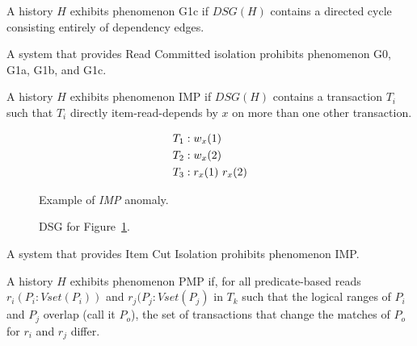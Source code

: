 \begin{definition}
A history $H$ exhibits phenomenon G1c if $DSG(H)$ contains a directed
cycle consisting entirely of dependency edges.
\end{definition}

\begin{definition}
A system that provides Read Committed isolation prohibits phenomenon G0, G1a, G1b, and G1c.
\end{definition}

\begin{definition}
\label{def:imp}
A history $H$ exhibits phenomenon IMP if $DSG(H)$ contains a
transaction $T_i$ such that $T_i$ directly item-read-depends by $x$ on more
than one other transaction.
\end{definition}

\begin{figure}[H]
\begin{align*}
\small
T_1 &: w_x(1)\\
T_2 &: w_x(2)\\
T_3 &: r_x(1)~r_x(2)
\end{align*}
\caption{Example of \textit{IMP} anomaly.}
\label{fig:nici-history}
\end{figure}

\begin{figure}[H]
\centering
{}
\caption{DSG for Figure~\ref{fig:nici-history}.}
\label{fig:nici-dsg}
\end{figure}

\begin{definition}
A system that provides Item Cut Isolation prohibits phenomenon IMP.
\end{definition}

\begin{definition}
A history $H$ exhibits phenomenon PMP if, for all predicate-based
reads $r_i(P_i:Vset(P_i))$ and $r_j(P_j:Vset(P_j)$ in $T_k$ such that
the logical ranges of $P_i$ and $P_j$ overlap (call it $P_o$), the set
of transactions that change the matches of $P_o$ for $r_i$ and $r_j$
differ.
\end{definition}

